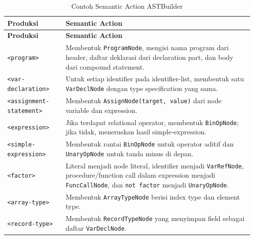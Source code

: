 \begin{longtable}{|p{5.2cm}|p{8.7cm}|}
    \caption{Contoh Semantic Action ASTBuilder} \label{tab:astbuilder-semantic-action}                                                                                                                                                    \\
    \hline
    \textbf{Produksi}               & \textbf{Semantic Action}                                                                                                                                                                            \\
    \hline
    \endfirsthead
    \hline
    \textbf{Produksi}               & \textbf{Semantic Action}                                                                                                                                                                            \\
    \hline
    \endhead
    \texttt{<program>}              & Membentuk \texttt{ProgramNode}, mengisi nama program dari header, daftar deklarasi dari declaration part, dan body dari compound statement.                                                         \\
    \hline
    \texttt{<var-declaration>}      & Untuk setiap identifier pada identifier-list, membentuk satu \texttt{VarDeclNode} dengan type specification yang sama.                                                                              \\
    \hline
    \texttt{<assignment-statement>} & Membentuk \texttt{AssignNode(target, value)} dari node variable dan expression.                                                                                                                     \\
    \hline
    \texttt{<expression>}           & Jika terdapat relational operator, membentuk \texttt{BinOpNode}; jika tidak, meneruskan hasil simple-expression.                                                                                    \\
    \hline
    \texttt{<simple-expression>}    & Membentuk rantai \texttt{BinOpNode} untuk operator aditif dan \texttt{UnaryOpNode} untuk tanda minus di depan.                                                                                      \\
    \hline
    \texttt{<factor>}               & Literal menjadi node literal, identifier menjadi \texttt{VarRefNode}, procedure/function call dalam expression menjadi \texttt{FuncCallNode}, dan \texttt{not factor} menjadi \texttt{UnaryOpNode}. \\
    \hline
    \texttt{<array-type>}           & Membentuk \texttt{ArrayTypeNode} berisi index type dan element type.                                                                                                                                \\
    \hline
    \texttt{<record-type>}          & Membentuk \texttt{RecordTypeNode} yang menyimpan field sebagai daftar \texttt{VarDeclNode}.                                                                                                         \\
    \hline
\end{longtable}

